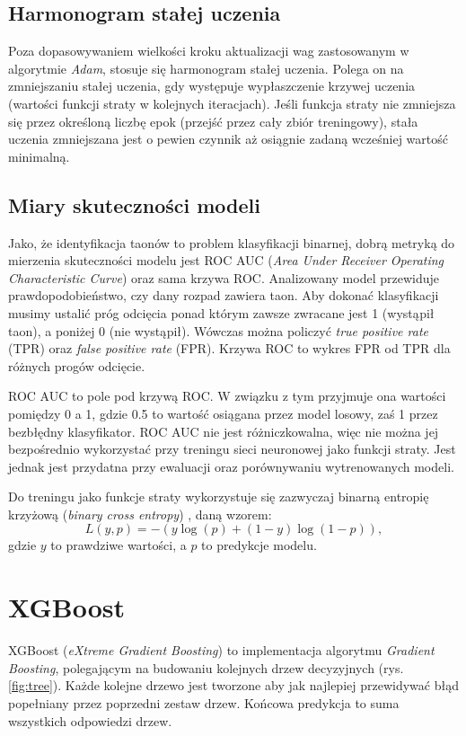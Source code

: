 \documentclass{pracalicmgr}
\begin{document}
	\subsection{Harmonogram stałej uczenia}
	Poza dopasowywaniem wielkości kroku aktualizacji wag zastosowanym w algorytmie \textit{Adam}, stosuje się harmonogram stałej uczenia. Polega on na zmniejszaniu stałej uczenia, gdy występuje wypłaszczenie krzywej uczenia (wartości funkcji straty w kolejnych iteracjach). Jeśli funkcja straty nie zmniejsza się przez określoną liczbę epok (przejść przez cały zbiór treningowy), stała uczenia zmniejszana jest o pewien czynnik aż osiągnie zadaną wcześniej wartość minimalną.
	
	\subsection{Miary skuteczności modeli}
	Jako, że identyfikacja taonów to problem klasyfikacji binarnej, dobrą metryką do mierzenia skuteczności modelu jest ROC AUC (\textit{Area Under Receiver Operating Characteristic Curve}) oraz sama krzywa ROC. Analizowany model przewiduje prawdopodobieństwo, czy dany rozpad zawiera taon. Aby dokonać klasyfikacji musimy ustalić próg odcięcia ponad którym zawsze zwracane jest 1 (wystąpił taon), a poniżej 0 (nie wystąpił). Wówczas można policzyć \textit{true positive rate} (TPR) oraz \textit{false positive rate} (FPR). Krzywa ROC to wykres FPR od TPR dla różnych progów odcięcie.
	
	ROC AUC to pole pod krzywą ROC. W związku z tym przyjmuje ona wartości pomiędzy 0 a 1, gdzie 0.5 to wartość osiągana przez model losowy, zaś 1 przez bezbłędny klasyfikator. ROC AUC nie jest różniczkowalna, więc nie można jej bezpośrednio wykorzystać przy treningu sieci neuronowej jako funkcji straty. Jest jednak jest przydatna przy ewaluacji oraz porównywaniu wytrenowanych modeli.
	
	Do treningu jako funkcje straty wykorzystuje się zazwyczaj binarną entropię krzyżową (\textit{binary cross entropy}) \cite{dl}, daną wzorem: $$ L(y, p) = -(y\log(p)+(1-y)\log(1-p)),$$ gdzie $y$ to prawdziwe wartości, a $p$ to predykcje modelu.
	
	\section{XGBoost}
	XGBoost (\textit{eXtreme Gradient Boosting}) \cite{xgboost} to implementacja algorytmu \textit{Gradient Boosting}, polegającym na budowaniu kolejnych drzew decyzyjnych (rys. \ref{fig:tree}). Każde kolejne drzewo jest tworzone aby jak najlepiej przewidywać błąd popełniany przez poprzedni zestaw drzew. Końcowa predykcja to suma wszystkich odpowiedzi drzew.
	
\end{document}
